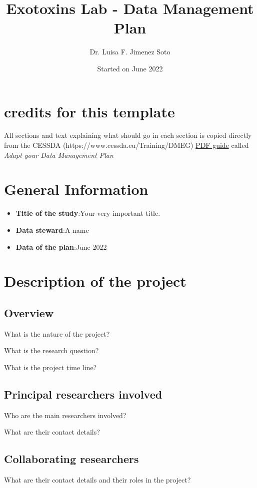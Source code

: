 \documentclass[11pt,a4paper]{article}
\author{Dr. Luisa F. Jimenez Soto}
\title{Exotoxins Lab - Data Management Plan}
\date{Started on June 2022}
\begin{document}
	\maketitle
	
	
	
	\section{credits for this template}
	All sections and text explaining what should go in each section is copied directly from the CESSDA (https://www.cessda.eu/Training/DMEG) \href{URL}{PDF guide} called \textit{Adapt your Data Management Plan}
		

	\section[general info]{General Information}
	
	\begin{itemize}
		\item\textbf{Title of the study}:\tab Your very important title.
		\item\textbf{Data steward}:\tab A name
		\item\textbf{Data of the plan}:\tab June 2022
	\end{itemize}

	\section{Description of the project}
	\subsection{Overview}
	What is the nature of the project?
	
	What is the research question?
	
	What is the project time line?
	\subsection{Principal researchers involved}
	Who are the main researchers involved?
	
	What are their contact details?
	\subsection{Collaborating researchers}
	What are their contact details and their roles in the project?
	
\end{document}
